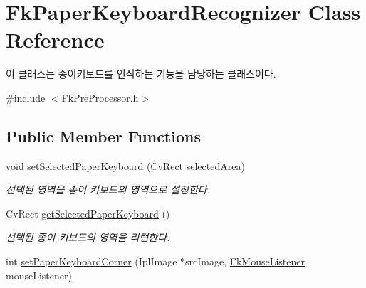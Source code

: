 \hypertarget{class_fk_paper_keyboard_recognizer}{}\section{Fk\+Paper\+Keyboard\+Recognizer Class Reference}
\label{class_fk_paper_keyboard_recognizer}


이 클래스는 종이키보드를 인식하는 기능을 담당하는 클래스이다.  




{\ttfamily \#include $<$Fk\+Pre\+Processor.\+h$>$}

\subsection*{Public Member Functions}
\begin{DoxyCompactItemize}
\item 
\hypertarget{class_fk_paper_keyboard_recognizer_ab9433e453185e7e8ed01c745661dfbe1}{}void \hyperlink{class_fk_paper_keyboard_recognizer_ab9433e453185e7e8ed01c745661dfbe1}{set\+Selected\+Paper\+Keyboard} (Cv\+Rect selected\+Area)\label{class_fk_paper_keyboard_recognizer_ab9433e453185e7e8ed01c745661dfbe1}

\begin{DoxyCompactList}\small\item\em 선택된 영역을 종이 키보드의 영역으로 설정한다. \end{DoxyCompactList}\item 
\hypertarget{class_fk_paper_keyboard_recognizer_aa39e07f68eb4a24e54063570614c36a7}{}Cv\+Rect \hyperlink{class_fk_paper_keyboard_recognizer_aa39e07f68eb4a24e54063570614c36a7}{get\+Selected\+Paper\+Keyboard} ()\label{class_fk_paper_keyboard_recognizer_aa39e07f68eb4a24e54063570614c36a7}

\begin{DoxyCompactList}\small\item\em 선택된 종이 키보드의 영역을 리턴한다. \end{DoxyCompactList}\item 
\hypertarget{class_fk_paper_keyboard_recognizer_a0842adf59d09fe8f9f47fb44f328520f}{}int \hyperlink{class_fk_paper_keyboard_recognizer_a0842adf59d09fe8f9f47fb44f328520f}{set\+Paper\+Keyboard\+Corner} (Ipl\+Image $\ast$src\+Image, \hyperlink{class_fk_mouse_listener}{Fk\+Mouse\+Listener} mouse\+Listener)\label{class_fk_paper_keyboard_recognizer_a0842adf59d09fe8f9f47fb44f328520f}


\end{DoxyCompactItemize}
